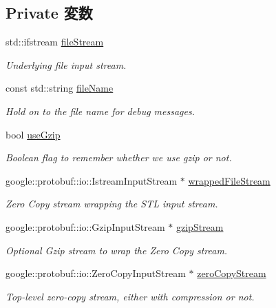 \subsection*{Private 変数}
\begin{DoxyCompactItemize}
\item 
std::ifstream \hyperlink{classProtoInputStream_a23e831057f578570b5bc50b8249d7868}{fileStream}
\begin{DoxyCompactList}\small\item\em Underlying file input stream. \item\end{DoxyCompactList}\item 
const std::string \hyperlink{classProtoInputStream_ab7777c9b2f880a5587b6602dbc331097}{fileName}
\begin{DoxyCompactList}\small\item\em Hold on to the file name for debug messages. \item\end{DoxyCompactList}\item 
bool \hyperlink{classProtoInputStream_a63bd265ebd8a0e6a43a46091b150f09f}{useGzip}
\begin{DoxyCompactList}\small\item\em Boolean flag to remember whether we use gzip or not. \item\end{DoxyCompactList}\item 
google::protobuf::io::IstreamInputStream $\ast$ \hyperlink{classProtoInputStream_a14b2c5b4efb9f0bc3b6aec7b2f4748e2}{wrappedFileStream}
\begin{DoxyCompactList}\small\item\em Zero Copy stream wrapping the STL input stream. \item\end{DoxyCompactList}\item 
google::protobuf::io::GzipInputStream $\ast$ \hyperlink{classProtoInputStream_a9c61d33e805fe8fffb88db16ca97e44c}{gzipStream}
\begin{DoxyCompactList}\small\item\em Optional Gzip stream to wrap the Zero Copy stream. \item\end{DoxyCompactList}\item 
google::protobuf::io::ZeroCopyInputStream $\ast$ \hyperlink{classProtoInputStream_ac8cebc34dff8667f4d940ad84a61ea13}{zeroCopyStream}
\begin{DoxyCompactList}\small\item\em Top-\/level zero-\/copy stream, either with compression or not. \item\end{DoxyCompactList}\end{DoxyCompactItemize}



